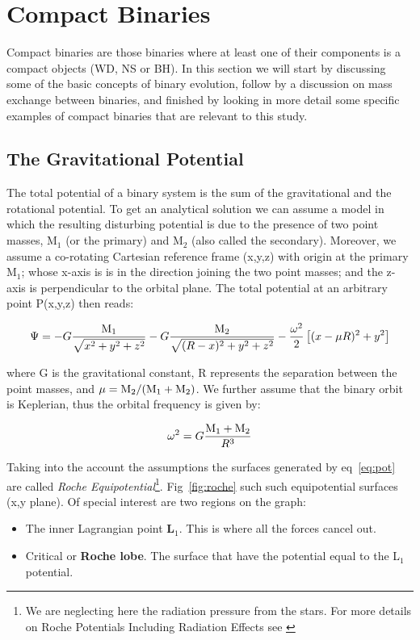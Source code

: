 \section[Compact Binaries]{Compact Binaries}\label{sec:cb}

Compact binaries are those binaries where at least one of their components is a compact objects (WD, NS or BH). In this section we will start by discussing some of the basic concepts of binary evolution, follow by a discussion on mass exchange between binaries,  and finished by looking in more detail some specific examples of compact binaries that are relevant to this study.   

\subsection{The Gravitational Potential}

The total potential of a binary system is the sum of the gravitational and the rotational potential. To get an analytical solution we can assume a model in which the resulting disturbing potential is due to the presence of two point masses, M$_1$ (or the primary) and M$_2$ (also called the secondary). Moreover, we assume a co-rotating Cartesian reference frame (x,y,z) with origin at the primary M$_1$; whose x-axis is is in the direction joining the two point masses; and the z-axis is perpendicular to the orbital plane. The total potential at an arbitrary point P(x,y,z) then reads:

\begin{equation}
        \Psi = - G \frac{\text M _1}{\sqrt{x^2+y^2+z^2}} - G \frac{\text M _2 }{\sqrt{(R - x)^2 + y^2 + z^2}} - \frac{\omega^2 }{2}  \left [ (x- \mu R )^2  + y^2 \right ]    
        \label{eq:pot}
\end{equation}

where G is the gravitational constant, R represents the separation between the point masses, and $\mu = \text M _2/(\text M _1 + \text M _2)$. We further assume that the binary orbit is Keplerian, thus the orbital frequency is given by:

\begin{equation}
        \omega ^2 = G \frac{\text M _1 + \text M _2}{R^3}
        \label{eq:roche}
\end{equation}

Taking into the account the assumptions the surfaces generated by eq~\ref{eq:pot} are called \emph{Roche Equipotential}\footnote{We are neglecting here the radiation pressure from the stars. For more details on Roche Potentials Including Radiation Effects see \cite{schuerman_roche_1972}}. Fig~\ref{fig:roche} such such equipotential surfaces (x,y plane). Of special interest are two regions on the graph:
\begin{itemize}
        \item The inner Lagrangian point \textbf{L$_1$}. This is where all the forces cancel out. 
        \item Critical or \textbf{Roche lobe}. The surface that have the potential equal to the L$_1$ potential. 
\end{itemize}

